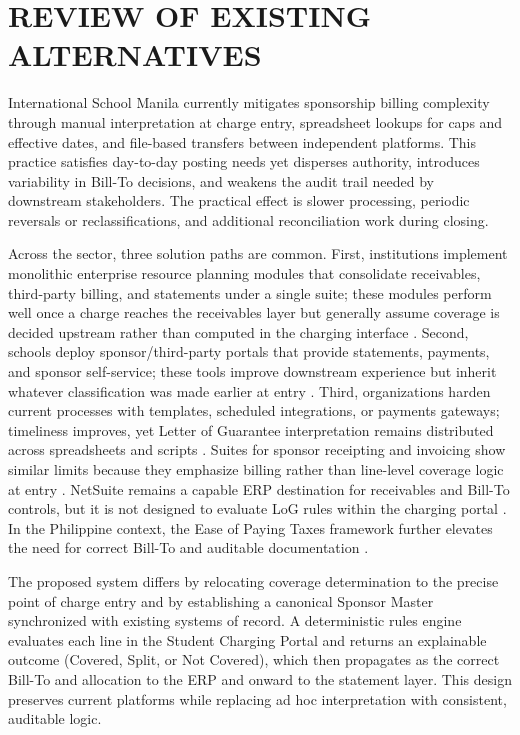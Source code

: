 \section{REVIEW OF EXISTING ALTERNATIVES}

International School Manila currently mitigates sponsorship billing complexity through manual interpretation at charge entry, spreadsheet lookups for caps and effective dates, and file-based transfers between independent platforms. This practice satisfies day-to-day posting needs yet disperses authority, introduces variability in Bill-To decisions, and weakens the audit trail needed by downstream stakeholders. The practical effect is slower processing, periodic reversals or reclassifications, and additional reconciliation work during closing.

Across the sector, three solution paths are common. First, institutions implement monolithic enterprise resource planning modules that consolidate receivables, third-party billing, and statements under a single suite; these modules perform well once a charge reaches the receivables layer but generally assume coverage is decided upstream rather than computed in the charging interface \citep{EllucianBannerARGuide2025,PeopleSoftSFThirdParty,BannerARWorkbook}. Second, schools deploy sponsor/third-party portals that provide statements, payments, and sponsor self-service; these tools improve downstream experience but inherit whatever classification was made earlier at entry \citep{TouchNetSponsorPoint,NelnetSponsorBilling,UTKSponsorPoint,SponsorPaymentsPortal}. Third, organizations harden current processes with templates, scheduled integrations, or payments gateways; timeliness improves, yet Letter of Guarantee interpretation remains distributed across spreadsheets and scripts \citep{PayMyTuitionSponsored,PayMyTuitionNewswire}. Suites for sponsor receipting and invoicing show similar limits because they emphasize billing rather than line-level coverage logic at entry \citep{TribalEbsSponsor,TribalEbsManagePayments}. NetSuite remains a capable ERP destination for receivables and Bill-To controls, but it is not designed to evaluate LoG rules within the charging portal \citep{NetSuiteThirdParty}. In the Philippine context, the Ease of Paying Taxes framework further elevates the need for correct Bill-To and auditable documentation \citep{BIR_EOPT}.

The proposed system differs by relocating coverage determination to the precise point of charge entry and by establishing a canonical Sponsor Master synchronized with existing systems of record. A deterministic rules engine evaluates each line in the Student Charging Portal and returns an explainable outcome (Covered, Split, or Not Covered), which then propagates as the correct Bill-To and allocation to the ERP and onward to the statement layer. This design preserves current platforms while replacing ad hoc interpretation with consistent, auditable logic.


